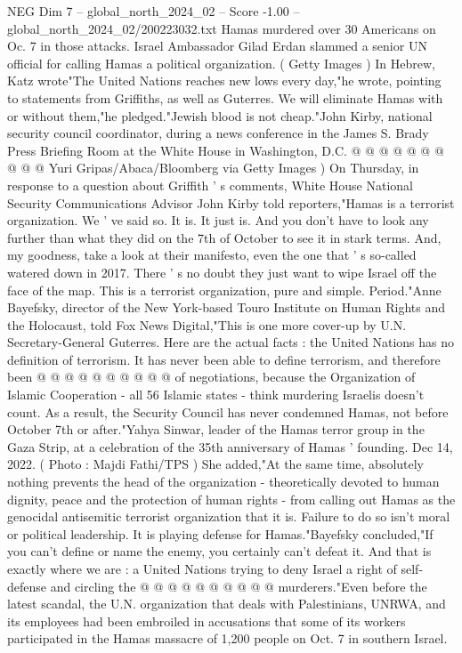 \begin{textsample}{NEG Dim 7 – global\_north\_2024\_02 – Score -1.00 – global\_north\_2024\_02/200223032.txt}
Hamas murdered over 30 Americans on Oc. 7 in those attacks.
Israel Ambassador Gilad Erdan slammed a senior UN official for calling Hamas a political organization. ( Getty Images ) In Hebrew, Katz wrote"The United Nations reaches new lows every day,"he wrote, pointing to statements from Griffiths, as well as Guterres.
We will eliminate Hamas with or without them,"he pledged."Jewish blood is not cheap."John Kirby, national security council coordinator, during a news conference in the James S.
Brady Press Briefing Room at the White House in Washington, D.C. @ @ @ @ @ @ @ @ @ @ Yuri Gripas/Abaca/Bloomberg via Getty Images ) On Thursday, in response to a question about Griffith ' s comments, White House National Security Communications Advisor John Kirby told reporters,"Hamas is a terrorist organization.
We ' ve said so.
It is.
It just is.
And you don't have to look any further than what they did on the 7th of October to see it in stark terms.
And, my goodness, take a look at their manifesto, even the one that ' s so-called watered down in 2017.
There ' s no doubt they just want to wipe Israel off the face of the map.
This is a terrorist organization, pure and simple.
Period."Anne Bayefsky, director of the New York-based Touro Institute on Human Rights and the Holocaust, told Fox News Digital,"This is one more cover-up by U.N.
Secretary-General Guterres.
Here are the actual facts : the United Nations has no definition of terrorism.
It has never been able to define terrorism, and therefore been @ @ @ @ @ @ @ @ @ @ of negotiations, because the Organization of Islamic Cooperation - all 56 Islamic states - think murdering Israelis doesn't count.
As a result, the Security Council has never condemned Hamas, not before October 7th or after."Yahya Sinwar, leader of the Hamas terror group in the Gaza Strip, at a celebration of the 35th anniversary of Hamas ' founding.
Dec 14, 2022. ( Photo : Majdi Fathi/TPS ) She added,"At the same time, absolutely nothing prevents the head of the organization - theoretically devoted to human dignity, peace and the protection of human rights - from calling out Hamas as the genocidal antisemitic terrorist organization that it is.
Failure to do so isn't moral or political leadership.
It is playing defense for Hamas."Bayefsky concluded,"If you can't define or name the enemy, you certainly can't defeat it.
And that is exactly where we are : a United Nations trying to deny Israel a right of self-defense and circling the @ @ @ @ @ @ @ @ @ @ murderers."Even before the latest scandal, the U.N. organization that deals with Palestinians, UNRWA, and its employees had been embroiled in accusations that some of its workers participated in the Hamas massacre of 1,200 people on Oct. 7 in southern Israel.

\end{textsample}
